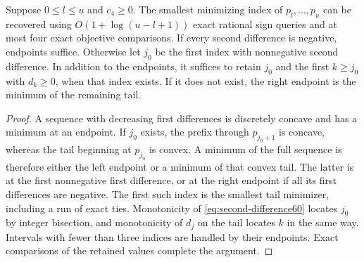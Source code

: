 \begin{lemma}\label{lem:piece60}
Suppose $0\le l\le u$ and $c_4\ge0$. The smallest minimizing index of $p_l,\ldots,p_u$ can be recovered using $O(1+\log(u-l+1))$ exact rational sign queries and at most four exact objective comparisons. If every second difference is negative, endpoints suffice. Otherwise let $j_0$ be the first index with nonnegative second difference. In addition to the endpoints, it suffices to retain $j_0$ and the first $k\ge j_0$ with $d_k\ge0$, when that index exists. If it does not exist, the right endpoint is the minimum of the remaining tail.
\end{lemma}
\begin{proof}
A sequence with decreasing first differences is discretely concave and has a minimum at an endpoint. If $j_0$ exists, the prefix through $p_{j_0+1}$ is concave, whereas the tail beginning at $p_{j_0}$ is convex. A minimum of the full sequence is therefore either the left endpoint or a minimum of that convex tail. The latter is at the first nonnegative first difference, or at the right endpoint if all its first differences are negative. The first such index is the smallest tail minimizer, including a run of exact ties. Monotonicity of \eqref{eq:second-difference60} locates $j_0$ by integer bisection, and monotonicity of $d_j$ on the tail locates $k$ in the same way. Intervals with fewer than three indices are handled by their endpoints. Exact comparisons of the retained values complete the argument.
\end{proof}

